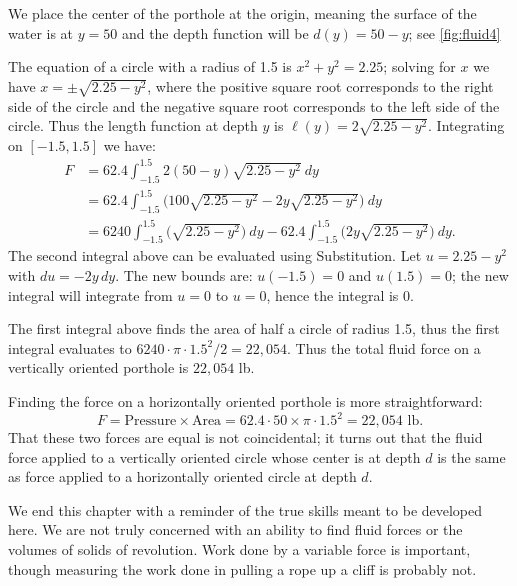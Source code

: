 {We place the center of the porthole at the origin, meaning the surface of the water is at $y=50$ and the depth function will be $d(y)=50-y$; see \autoref{fig:fluid4} 

The equation of a circle with a radius of 1.5 is $x^2+y^2=2.25$; solving for $x$ we have $x=\pm \sqrt{2.25-y^2}$, where the positive square root corresponds to the right side of the circle and the negative square root corresponds to the left side of the circle. Thus the length function at depth $y$ is $\ell(y) = 2\sqrt{2.25-y^2}$. Integrating on $[-1.5,1.5]$ we have:
\begin{align*}
	F
	&= 62.4\int_{-1.5}^{1.5} 2(50-y)\sqrt{2.25-y^2}\ dy \\
	&= 62.4\int_{-1.5}^{1.5} \big(100\sqrt{2.25-y^2} - 2y\sqrt{2.25-y^2}\big)\ dy \\
	&= 6240\int_{-1.5}^{1.5} \big(\sqrt{2.25-y^2}\big)\ dy - 62.4\int_{-1.5}^{1.5} \big(2y\sqrt{2.25-y^2}\big)\ dy.
\end{align*}			
The second integral above can be evaluated using Substitution. Let $u=2.25-y^2$ with $du = -2y\,dy$. The new bounds are: $u(-1.5)=0$ and $u(1.5)=0$; the new integral will integrate from $u=0$ to $u=0$, hence the integral is 0.

The first integral above finds the area of half a circle of radius 1.5, thus the first integral evaluates to $6240\cdot\pi\cdot1.5^2/2 = 22,054$. Thus the total fluid force on a vertically oriented porthole is $22,054$ lb.

Finding the force on a horizontally oriented porthole is more straightforward:
$$F = \text{Pressure}\times\text{Area} = 62.4\cdot50\times \pi\cdot1.5^2 = 22,054\text{ lb}.$$
That these two forces are equal is not coincidental; it turns out that the fluid force applied to a vertically oriented circle whose center is at depth $d$ is the same as force applied to a horizontally oriented circle at depth $d$.}

We end this chapter with a reminder of the true skills meant to be developed here. We are not truly concerned with an ability to find fluid forces or the volumes of solids of revolution. Work done by a variable force is important, though measuring the work done in pulling a rope up a cliff is probably not.

